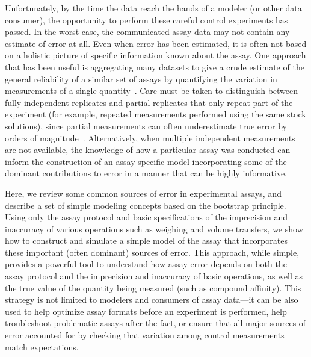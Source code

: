 \documentclass[aps,pre,twocolumn,nofootinbib,superscriptaddress,linenumbers]{revtex4-1}
\begin{document}
Unfortunately, by the time the data reach the hands of a modeler (or other data consumer), the opportunity to perform these careful control experiments has passed.
In the worst case, the communicated assay data may not contain any estimate of error at all. 
Even when error has been estimated, it is often not based on a holistic picture of specific information known about the assay.
One approach that has been useful is aggregating many datasets to give a crude estimate of the general reliability of a similar set of assays by quantifying the variation in measurements of a single quantity~\cite{kramer_experimental_2012,kalliokoski_comparability_2013}. 
Care must be taken to distinguish between fully independent replicates and partial replicates that only repeat part of the experiment (for example, repeated measurements performed using the same stock solutions), since partial measurements can often underestimate true error by orders of magnitude~\cite{chodera_entropy-enthalpy_2013}.
Alternatively, when multiple independent measurements are not available, the knowledge of how a particular assay was conducted can inform the construction of an assay-specific model incorporating some of the dominant contributions to error in a manner that can be highly informative.

Here, we review some common sources of error in experimental assays, and describe a set of simple modeling concepts based on the bootstrap principle.
Using only the assay protocol and basic specifications of the imprecision and inaccuracy of various operations such as weighing and volume transfers, we show how to construct and simulate a simple model of the assay that incorporates these important (often dominant) sources of error. 
This approach, while simple, provides a powerful tool to understand how assay error depends on both the assay protocol and the imprecision and inaccuracy of basic operations, as well as the true value of the quantity being measured (such as compound affinity). 
This strategy is not limited to modelers and consumers of assay data---it can be also used to help optimize assay formats before an experiment is performed, help troubleshoot problematic assays after the fact, or ensure that all major sources of error accounted for by checking that variation among control measurements match expectations.
\end{document}
